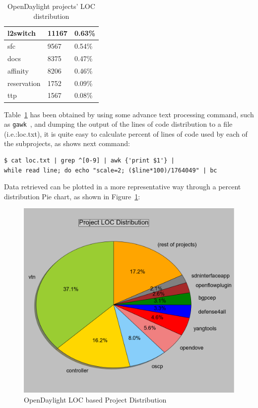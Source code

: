 \documentclass[a4paper, 12pt]{book}
\begin{document}
\begin{table}
\begin{center}
\begin{tabular}{|l|l|l|}
l2switch          & 11167  &  0.63\% \\ \hline
sfc               & 9567   &  0.54\% \\ \hline
docs              & 8375   &  0.47\% \\ \hline
affinity          & 8206   &  0.46\% \\ \hline
reservation       & 1752   &  0.09\% \\ \hline
ttp               & 1567   &  0.08\% \\ \hline
\end{tabular}
\end{center}
\caption{OpenDaylight projects' LOC distribution}
\label{tab:projectlocdistribution}
\end{table}

Table~\ref{tab:projectlocdistribution} has been obtained by using some advance text processing command, such as \texttt{gawk}~\cite{GAWK}, and dumping the output of the lines of code distribution to a file (i.e.:loc.txt), it is quite easy to calculate percent of lines of code used by each of the subprojects, as shows next command:
\begin{verbatim}
$ cat loc.txt | grep ^[0-9] | awk {'print $1'} |
while read line; do echo "scale=2; ($line*100)/1764049" | bc
\end{verbatim}
Data retrieved can be plotted in a more representative way through a percent distribution Pie chart, as shown in Figure~\ref{fig:odl_prog_loc_dist_diagram}:
\begin{figure}
 \begin{center}
   \includegraphics[width=15cm]{img/sloc-project-distritbution-02.png}
   \caption{OpenDaylight LOC based Project Distribution}
   \label{fig:odl_prog_loc_dist_diagram}
 \end{center}
\end{figure}
\end{document}
